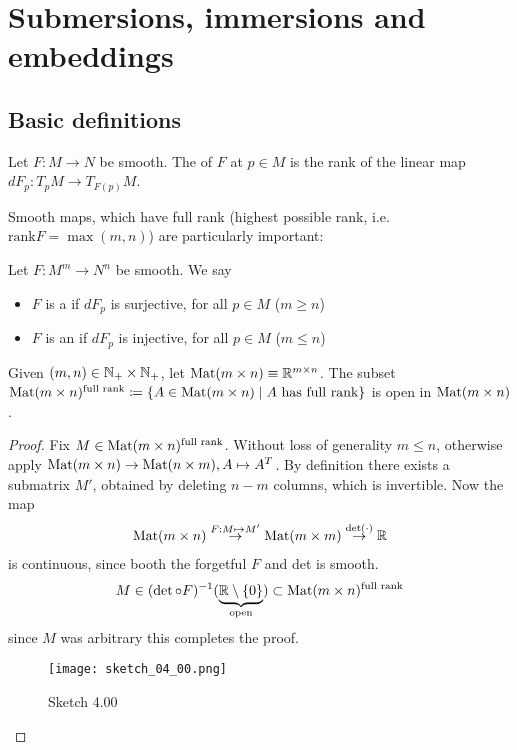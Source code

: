 \chapter{Submersions, immersions and embeddings}

\section{Basic definitions}

\begin{definition*}
    Let \(F:M\to N\) be smooth. The  of \(F\) at \(p\in M\)
    is the rank of the linear map \(dF_p:T_p M \to T_{F(p)}M\).
\end{definition*}

Smooth maps, which have full rank (highest possible rank, i.e. \(\text{rank} F=\max(m,n)\)) are particularly important:
\begin{definition*}
    Let \(F:M^m\to N^n\) be smooth. 
    We say \begin{itemize}
        \item \(F\) is a  if \(dF_p\) is surjective, for all \(p\in M\) (\(m\geq n\))
        \item \(F\) is an  if \(dF_p\) is injective, for all \(p\in M\) (\(m\leq n\))
    \end{itemize}
\end{definition*}

\begin{lemma}\label{lem:4.1}
    Given \((m,n)\in \mathbb{N}_+\times \mathbb{N}_+\), let \({\text{Mat}}(m\times n)\equiv \mathbb{R}^{m\times n}\).
    The subset \({\text{Mat}}(m\times n)^{\text{full rank}}\coloneqq \{A\in {\text{Mat}}(m\times n)\mid A\text{ has full rank}\}\)
    is open in \({\text{Mat}}(m\times n)\).
\end{lemma}

\begin{proof}
    Fix \(M\in{\text{Mat}}(m\times n)^{\text{full rank}}\). Without loss of generality \(m\leq n\), otherwise 
    apply \({\text{Mat}}(m\times n)\to {\text{Mat}}(n\times m),A\mapsto A^T\). By definition 
    there exists a submatrix \(M'\), obtained by deleting \(n-m\) columns, which is invertible.
    Now the map 
    \begin{align*}
        {\text{Mat}}(m\times n)\stackrel{F:M\mapsto M'}{\to} {\text{Mat}}(m\times m)\stackrel{\text{det}(\cdot)}{\to} \mathbb{R}
    \end{align*}
    is continuous, since booth the forgetful \(F\) and det is smooth.
     \[M\in (\det\circ F)^{-1}(\underbrace{\mathbb{R}\setminus\{0\}}_{\text{open}})\subset {\text{Mat}}(m\times n)^{\text{full rank}}\]
    since \(M\) was arbitrary this completes the proof.
    \begin{figure}[H]
        \centering
        \texttt{[image: sketch\_04\_00.png]}
        \caption{Sketch 4.00}
    \end{figure}
\end{proof}

